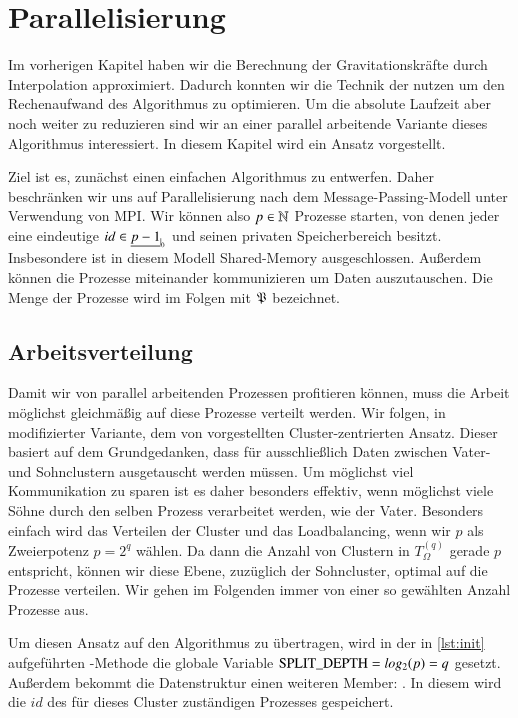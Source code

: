 \section{Parallelisierung}
\label{sec:parallelpart}
  Im vorherigen Kapitel haben wir die Berechnung der Gravitationskräfte durch Interpolation approximiert. Dadurch konnten wir die Technik der \hquad nutzen um den Rechenaufwand des Algorithmus zu 
  optimieren.
  Um die absolute Laufzeit aber noch weiter zu reduzieren sind wir an einer parallel arbeitende Variante dieses Algorithmus interessiert. In diesem Kapitel wird ein Ansatz vorgestellt.
  
  Ziel ist es, zunächst einen einfachen Algorithmus zu entwerfen. Daher beschränken wir uns auf Parallelisierung nach dem Message-Passing-Modell unter Verwendung von MPI. Wir können also 
  $p \in \mathbb{N}$ Prozesse starten, von denen jeder eine eindeutige $id \in \nullhaken{p-1}$ und seinen privaten Speicherbereich besitzt. Insbesondere ist in diesem Modell Shared-Memory ausgeschlossen. 
  Außerdem können die Prozesse miteinander kommunizieren um Daten auszutauschen. Die Menge der Prozesse wird im Folgen mit $\mathfrak{P}$ bezeichnet.

  
  \subsection{Arbeitsverteilung}
  \label{sec:work}
    Damit wir von parallel arbeitenden Prozessen profitieren können, muss die Arbeit möglichst gleichmäßig auf diese Prozesse verteilt werden. Wir folgen, in modifizierter Variante, dem von 
    \citet{distrh2} vorgestellten Cluster-zentrierten Ansatz. 
    Dieser basiert auf dem Grundgedanken, dass für \vorruck ausschließlich Daten zwischen Vater- und Sohnclustern ausgetauscht werden müssen. Um möglichst viel Kommunikation zu sparen ist es daher
    besonders effektiv, wenn möglichst viele Söhne durch den selben Prozess verarbeitet werden, wie der Vater. Besonders einfach wird das Verteilen der Cluster und das Loadbalancing, wenn wir $p$ als 
    Zweierpotenz $p = 2^q$ wählen. Da dann die Anzahl von Clustern in $T_\Omega^{(q)}$ gerade $p$ entspricht, können wir diese Ebene, zuzüglich der Sohncluster, optimal auf die Prozesse verteilen.
    Wir gehen im Folgenden immer von einer so gewählten Anzahl Prozesse aus.
    
    Um diesen Ansatz auf den Algorithmus zu übertragen, wird in der in \autoref{lst:init} aufgeführten -Methode die globale Variable $\tcode{SPLIT_DEPTH} = log_2(p) = q$ gesetzt. 
    Außerdem bekommt die Datenstruktur  einen weiteren Member: . In diesem  wird die $id$ des für dieses Cluster zuständigen Prozesses gespeichert.
    
